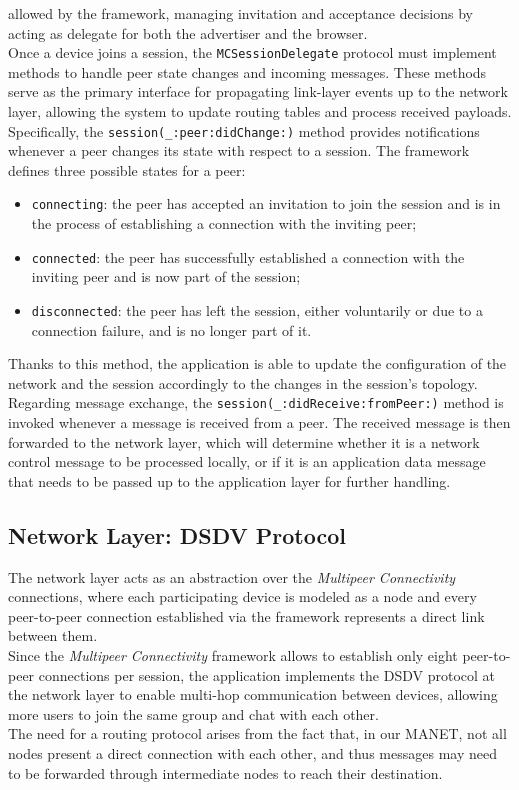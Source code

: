 \documentclass[conference]{IEEEtran}
\begin{document}
allowed by the framework, managing invitation and acceptance decisions by acting
as delegate for both the advertiser and the browser. \\
Once a device joins a session, the \texttt{MCSessionDelegate} protocol must
implement methods to handle peer state changes and incoming messages.
These methods serve as the primary interface for propagating link-layer events
up to the network layer, allowing the system to update routing tables and
process received payloads. \\ 
Specifically, the \texttt{session(\_:peer:didChange:)} method provides
notifications whenever a peer changes its state with respect to a session. The
framework defines three possible states for a peer: 
\begin{itemize}
    \item \texttt{connecting}: the peer has accepted an invitation to join the
    session and is in the process of establishing a connection with the inviting
    peer;
    \item \texttt{connected}: the peer has successfully established a connection
    with the inviting peer and is now part of the session;
    \item \texttt{disconnected}: the peer has left the session, either
    voluntarily or due to a connection failure, and is no longer part of it.
\end{itemize}
Thanks to this method, the application is able to update the configuration of
the network and the session accordingly to the changes in the session's
topology. \\
Regarding message exchange, the \texttt{session(\_:didReceive:fromPeer:)}
method is invoked whenever a message is received from a peer. The received
message is then forwarded to the network layer, which will determine whether it
is a network control message to be processed locally, or if it is an application 
data message that needs to be passed up to the application layer for further
handling. \\

\subsection{Network Layer: DSDV Protocol}
The network layer acts as an abstraction over the \textit{Multipeer
Connectivity} connections, where each participating device is modeled as a node
and every peer-to-peer connection established via the framework represents a
direct link between them. \\
Since the \textit{Multipeer Connectivity} framework allows to establish only
eight peer-to-peer connections per session, the application implements the DSDV
protocol at the network layer to enable multi-hop communication between devices,
allowing more users to join the same group and chat with each other. \\ 
The need for a routing protocol arises from the fact that, in our MANET,
not all nodes present a direct connection with each other, and thus
messages may need to be forwarded through intermediate nodes to reach their
destination. \\ 
\end{document}
